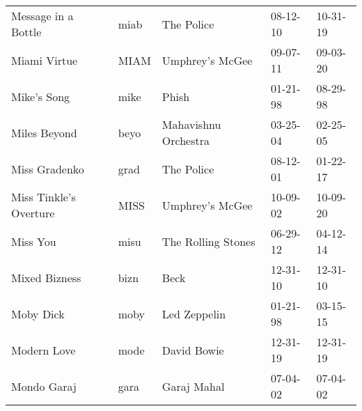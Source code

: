 \begin{longtable}{p{}p{}p{}p{}p{}}
                                                     Message in a Bottle &          miab &                                               The Police &              08-12-10 &             10-31-19 \\
                                                            Miami Virtue &          MIAM &                                          Umphrey's McGee &              09-07-11 &             09-03-20 \\
                                                             Mike's Song &          mike &                                                    Phish &              01-21-98 &             08-29-98 \\
                                                            Miles Beyond &          beyo &                                     Mahavishnu Orchestra &              03-25-04 &             02-25-05 \\
                                                           Miss Gradenko &          grad &                                               The Police &              08-12-01 &             01-22-17 \\
                                                  Miss Tinkle's Overture &          MISS &                                          Umphrey's McGee &              10-09-02 &             10-09-20 \\
                                                                Miss You &          misu &                                       The Rolling Stones &              06-29-12 &             04-12-14 \\
                                                           Mixed Bizness &          bizn &                                                     Beck &              12-31-10 &             12-31-10 \\
                                                               Moby Dick &          moby &                                             Led Zeppelin &              01-21-98 &             03-15-15 \\
                                                             Modern Love &          mode &                                              David Bowie &              12-31-19 &             12-31-19 \\
                                                             Mondo Garaj &          gara &                                              Garaj Mahal &              07-04-02 &             07-04-02 \\

\end{longtable}
